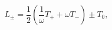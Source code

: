 \begin{equation}
	L_{\pm}=\frac{1}{2}
	\left(
	\frac{1}{\omega}T_{+}+\omega T_{-}
	\right)
	\pm T_{0},
\end{equation}

